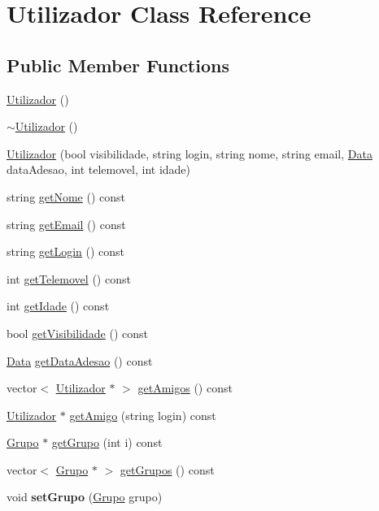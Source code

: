 \hypertarget{class_utilizador}{}\section{Utilizador Class Reference}
\label{class_utilizador}
\subsection*{Public Member Functions}
\begin{DoxyCompactItemize}
\item 
\hyperlink{class_utilizador_a264cb21da71b44fc2d5cfb21e58fa24a}{Utilizador} ()
\item 
\hyperlink{class_utilizador_aa0c2432b0a0f7b64ca5e7232ceec2869}{$\sim$\+Utilizador} ()
\item 
\hyperlink{class_utilizador_a470435e7e91ef2aa93eaf97b0615499b}{Utilizador} (bool visibilidade, string login, string nome, string email, \hyperlink{class_data}{Data} data\+Adesao, int telemovel, int idade)
\item 
string \hyperlink{class_utilizador_aa5af9c1385b0a93116dd8a80264b887a}{get\+Nome} () const 
\item 
string \hyperlink{class_utilizador_a9fc99ac7634ff085ca0f3afd4d502cc7}{get\+Email} () const 
\item 
string \hyperlink{class_utilizador_ad6c565c391bd19de3462e50a4e05c9a6}{get\+Login} () const 
\item 
int \hyperlink{class_utilizador_a60b66b8e80767719861a2d712f1bcbe4}{get\+Telemovel} () const 
\item 
int \hyperlink{class_utilizador_a9abaeb6fbff49683f57164a57e6f0c90}{get\+Idade} () const 
\item 
bool \hyperlink{class_utilizador_a99cdee165a8446fb67f3e0cab0831e80}{get\+Visibilidade} () const 
\item 
\hyperlink{class_data}{Data} \hyperlink{class_utilizador_af6c41442d2029ccb1a135092a5c27007}{get\+Data\+Adesao} () const 
\item 
vector$<$ \hyperlink{class_utilizador}{Utilizador} $\ast$ $>$ \hyperlink{class_utilizador_ad76009d2278707a5c9a1e8088633cfd2}{get\+Amigos} () const 
\item 
\hyperlink{class_utilizador}{Utilizador} $\ast$ \hyperlink{class_utilizador_a13a11370779713c7de00ea62f5c3799b}{get\+Amigo} (string login) const 
\item 
\hyperlink{class_grupo}{Grupo} $\ast$ \hyperlink{class_utilizador_a0b6cd97f274e49649b0c2c7ba0497261}{get\+Grupo} (int i) const 
\item 
vector$<$ \hyperlink{class_grupo}{Grupo} $\ast$ $>$ \hyperlink{class_utilizador_ad3f06aaa4199be8c1742e7126633ec26}{get\+Grupos} () const 
\item 
\hypertarget{class_utilizador_abacb3c819ca3de558fcab28f4af50c2e}{}void {\bfseries set\+Grupo} (\hyperlink{class_grupo}{Grupo} grupo)\label{class_utilizador_abacb3c819ca3de558fcab28f4af50c2e}


\end{DoxyCompactItemize}
